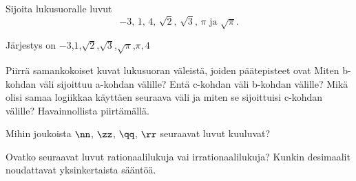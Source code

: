 \begin{tehtavasivu}

\begin{tehtava}%
Sijoita lukusuoralle luvut
\[
\mbox{$-3$, $1$, $4$, $\sqrt{2}$, $\sqrt{3}$, $\pi$ ja $\sqrt{\pi}$.}
\]
	\begin{vastaus}
Järjestys on \mbox{$-3$,$1$,$\sqrt{2}$,$\sqrt{3}$,$\sqrt{\pi}$,$\pi,4$}
	\end{vastaus}
\end{tehtava}

\begin{tehtava} %
Piirrä samankokoiset kuvat lukusuoran väleistä, joiden päätepisteet ovat 
Miten b-kohdan väli sijoittuu a-kohdan välille? Entä c-kohdan väli b-kohdan välille? Mikä olisi samaa logiikkaa käyttäen seuraava väli ja miten se sijoittuisi c-kohdan välille? Havainnollista piirtämällä.
	\begin{vastaus}
\alakohdat{
}
	\end{vastaus}
\end{tehtava}

\begin{tehtava}
Mihin joukoista $\nn$, $\zz$, $\qq$, $\rr$ seuraavat luvut kuuluvat?
	\begin{vastaus}
	\end{vastaus}
\end{tehtava}

\begin{tehtava}
Ovatko seuraavat luvut rationaalilukuja vai irrationaalilukuja? Kunkin desimaalit noudattavat yksinkertaista sääntöä.
\begin{vastaus}
\end{vastaus}
\end{tehtava}


\end{tehtavasivu}
